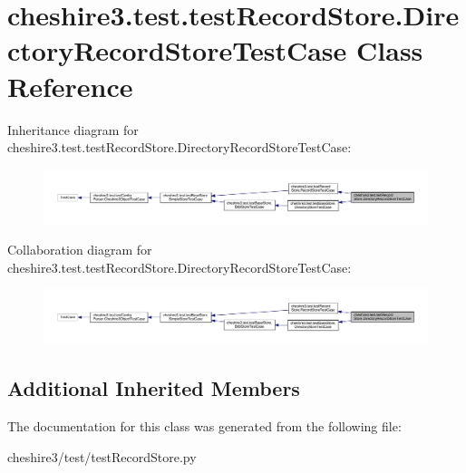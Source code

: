 \hypertarget{classcheshire3_1_1test_1_1test_record_store_1_1_directory_record_store_test_case}{\section{cheshire3.\-test.\-test\-Record\-Store.\-Directory\-Record\-Store\-Test\-Case Class Reference}
\label{classcheshire3_1_1test_1_1test_record_store_1_1_directory_record_store_test_case}
}


Inheritance diagram for cheshire3.\-test.\-test\-Record\-Store.\-Directory\-Record\-Store\-Test\-Case\-:
\nopagebreak
\begin{figure}[H]
\begin{center}
\leavevmode
\includegraphics[width=350pt]{classcheshire3_1_1test_1_1test_record_store_1_1_directory_record_store_test_case__inherit__graph}
\end{center}
\end{figure}


Collaboration diagram for cheshire3.\-test.\-test\-Record\-Store.\-Directory\-Record\-Store\-Test\-Case\-:
\nopagebreak
\begin{figure}[H]
\begin{center}
\leavevmode
\includegraphics[width=350pt]{classcheshire3_1_1test_1_1test_record_store_1_1_directory_record_store_test_case__coll__graph}
\end{center}
\end{figure}
\subsection*{Additional Inherited Members}


The documentation for this class was generated from the following file\-:\begin{DoxyCompactItemize}
\item 
cheshire3/test/test\-Record\-Store.\-py\end{DoxyCompactItemize}

